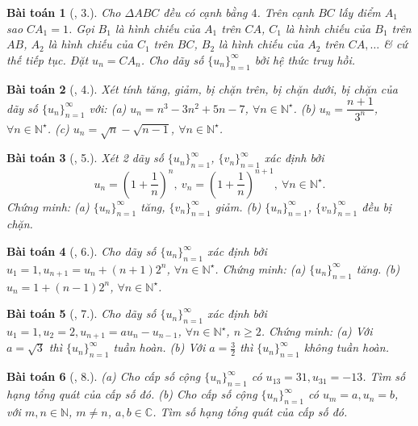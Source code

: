 \documentclass{article}
\newtheorem{baitoan}{Bài toán}
\begin{document}
\begin{baitoan}[\cite{TLCT_dai_so_giai_tich_11}, 3.]
	Cho $\Delta ABC$ đều có cạnh bằng $4$. Trên cạnh $BC$ lấy điểm $A_1$ sao $CA_1 = 1$. Gọi $B_1$ là hình chiếu của $A_1$ trên $CA$, $C_1$ là hình chiếu của $B_1$ trên $AB$, $A_2$ là hình chiếu của $C_1$ trên $BC$, $B_2$ là hình chiếu của $A_2$ trên $CA,\ldots$ \& cứ thế tiếp tục. Đặt $u_n = CA_n$. Cho dãy số $\{u_n\}_{n=1}^\infty$ bởi hệ thức truy hồi.
\end{baitoan}

\begin{baitoan}[\cite{TLCT_dai_so_giai_tich_11}, 4.]
	Xét tính tăng, giảm, bị chặn trên, bị chặn dưới, bị chặn của dãy số $\{u_n\}_{n=1}^\infty$ với: (a) $u_n = n^3 - 3n^2 + 5n - 7$, $\forall n\in\mathbb{N}^\star$. (b) $u_n = \dfrac{n + 1}{3^n}$, $\forall n\in\mathbb{N}^\star$. (c) $u_n = \sqrt{n} - \sqrt{n - 1}$, $\forall n\in\mathbb{N}^\star$.
\end{baitoan}

\begin{baitoan}[\cite{TLCT_dai_so_giai_tich_11}, 5.]
	Xét 2 dãy số $\{u_n\}_{n=1}^\infty$, $\{v_n\}_{n=1}^\infty$ xác định bởi
	\begin{equation*}
		u_n = \left(1 + \frac{1}{n}\right)^n,\ v_n = \left(1 + \frac{1}{n}\right)^{n+1},\ \forall n\in\mathbb{N}^\star.
	\end{equation*}
	Chứng minh: (a) $\{u_n\}_{n=1}^\infty$ tăng, $\{v_n\}_{n=1}^\infty$ giảm. (b) $\{u_n\}_{n=1}^\infty$, $\{v_n\}_{n=1}^\infty$ đều bị chặn.
\end{baitoan}

\begin{baitoan}[\cite{TLCT_dai_so_giai_tich_11}, 6.]
	Cho dãy số $\{u_n\}_{n=1}^\infty$ xác định bởi $u_1 = 1,u_{n+1} = u_n + (n + 1)2^n$, $\forall n\in\mathbb{N}^\star$. Chứng minh: (a) $\{u_n\}_{n=1}^\infty$ tăng. (b) $u_n = 1 + (n - 1)2^n$, $\forall n\in\mathbb{N}^\star$.
\end{baitoan}

\begin{baitoan}[\cite{TLCT_dai_so_giai_tich_11}, 7.]
	Cho dãy số $\{u_n\}_{n=1}^\infty$ xác định bởi $u_1 = 1,u_2 = 2,u_{n+1} = au_n - u_{n-1}$, $\forall n\in\mathbb{N}^\star$, $n\ge2$. Chứng minh: (a) Với $a = \sqrt{3}$ thì $\{u_n\}_{n=1}^\infty$ tuần hoàn. (b) Với $a = \frac{3}{2}$ thì $\{u_n\}_{n=1}^\infty$ không tuần hoàn.
\end{baitoan}

\begin{baitoan}[\cite{TLCT_dai_so_giai_tich_11}, 8.]
	(a) Cho cấp số cộng $\{u_n\}_{n=1}^\infty$ có $u_{13} = 31,u_{31} = -13$. Tìm số hạng tổng quát của cấp số đó. (b) Cho cấp số cộng $\{u_n\}_{n=1}^\infty$ có $u_m = a,u_n = b$, với $m,n\in\mathbb{N}$, $m\ne n$, $a,b\in\mathbb{C}$. Tìm số hạng tổng quát của cấp số đó.
\end{baitoan}
\end{document}
